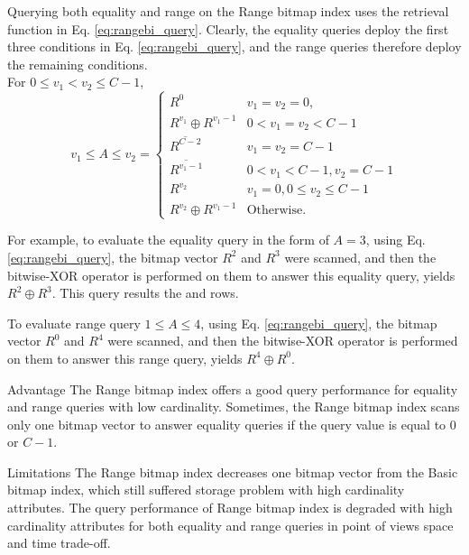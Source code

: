 \documentclass[../main/thesis.tex]{subfiles}
\begin{document}
Querying both equality and range on the Range bitmap index uses the retrieval function in Eq. \eqref{eq:rangebi_query}. Clearly, the equality queries deploy the first three conditions in Eq. \eqref{eq:rangebi_query}, and the range queries therefore deploy the remaining conditions.
\\
For $0 \leq v_1 < v_2 \leq C-1$,
\begin{equation}
\label{eq:rangebi_query}
v_1 \leq A \leq v_2 =
\begin{cases}
R^0 & v_1 = v_2 = 0, \\
R^{v_1} \oplus R^{v_1-1} & 0 < v_1 = v_2 < C-1 \\
\overline{R^{C-2}} & v_1 = v_2 = C-1 \\
\overline{R^{v_1-1}} & 0 < v_1 < C-1, v_2 = C-1 \\
R^{v_2} & v_1=0, 0 \leq v_2 \leq C-1 \\
R^{v_2} \oplus R^{v_1-1} & \text{Otherwise}.
\end{cases}
\end{equation}

For example, to evaluate the equality query in the form of $A=3$, using Eq. \eqref{eq:rangebi_query}, the bitmap vector $R^2$ and $R^3$ were scanned, and then the bitwise-XOR operator is performed on them to answer this equality query, yields $R^2 \oplus R^3$. This query results the  and  rows. 

To evaluate range query $1\leq A \leq 4$, using Eq. \eqref{eq:rangebi_query}, the bitmap vector $R^0$ and $R^4$ were scanned, and then the bitwise-XOR operator is performed on them to answer this range query, yields $R^4 \oplus R^0$.

\begin{prosNcons}{Advantage}
	The Range bitmap index offers a good query performance for equality and range queries with low cardinality. Sometimes, the Range bitmap index scans only one bitmap vector to answer equality queries if the query value is equal to 0 or $C-1$.
\end{prosNcons}

\begin{prosNcons}{Limitations}
	The Range bitmap index decreases one bitmap vector from the Basic bitmap index, which still suffered storage problem with high cardinality attributes. The query performance of Range bitmap index is degraded with high cardinality attributes for both equality and range queries in point of views space and time trade-off.
\end{prosNcons}
\end{document}
